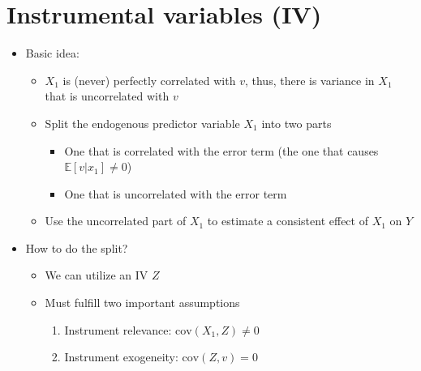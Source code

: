 \documentclass[10pt]{article}
\begin{document}
\section{Instrumental variables (IV)}
\begin{itemize}
    \item Basic idea: 
    \begin{itemize}
        \item $X_1 $ is (never) perfectly correlated with $v $, thus, there is variance in $X_1 $ that is uncorrelated with $v $
        \item Split the endogenous predictor variable $X_1 $ into two parts 
        \begin{itemize}
            \item One that is correlated with the error term (the one that causes $\mathbb{E}[v|x_1] \neq 0 $)
            \item One that is uncorrelated with the error term 
        \end{itemize}
        \item Use the uncorrelated part of $X_1 $ to estimate a consistent effect of $X_1 $ on $Y $
    \end{itemize}
    \item How to do the split?
    \begin{itemize}
        \item We can utilize an IV $Z $
        \item Must fulfill two important assumptions 
        \begin{enumerate}
            \item Instrument relevance: $\text{cov}(X_1, Z) \neq 0 $
            \item Instrument exogeneity: $\text{cov}(Z, v) = 0 $
        \end{enumerate}
    \end{itemize}
\end{itemize}
\newpage 
\end{document}
